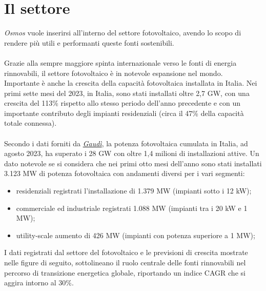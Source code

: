 \documentclass[a4paper, 12pt]{article}
\begin{document}
	\section{Il settore}
	\emph{Osmos} vuole inserirsi all'interno del settore fotovoltaico, avendo lo scopo di rendere più utili e performanti queste fonti sostenibili.\\\\
	Grazie alla sempre maggiore spinta internazionale verso le fonti di energia rinnovabili, il settore fotovoltaico è in notevole espansione nel mondo.\\
	Importante è anche la crescita della capacità fotovoltaica installata in Italia. Nei primi sette mesi del 2023, in Italia, sono stati installati oltre 2,7 GW, con una crescita del 113\% rispetto allo stesso periodo dell'anno precedente e con un importante contributo degli impianti residenziali (circa il 47\% della capacità totale connessa).\\\\
	Secondo i dati forniti da \href{https://www.terna.it/it/sistema-elettrico/dispacciamento/fonti-rinnovabili}{\emph{Gaudì}}, la potenza fotovoltaica cumulata in Italia, ad agosto 2023, ha superato i 28 GW con oltre 1,4 milioni di installazioni attive. Un dato notevole se si considera che nei primi otto mesi dell'anno sono stati installati 3.123 MW di potenza fotovoltaica con andamenti diversi per i vari segmenti:
	\begin{itemize}
		\item residenziali registrati l'installazione di 1.379 MW (impianti sotto i 12 kW);
		\item commerciale ed industriale  registrati 1.088 MW (impianti tra i 20 kW e 1 MW); 
		\item utility-scale aumento di 426 MW (impianti con potenza superiore a 1 MW);
	\end{itemize}
	I dati registrati dal settore del fotovoltaico e le previsioni di crescita mostrate nelle figure di seguito, sottolineano il ruolo centrale delle fonti rinnovabili nel percorso di transizione energetica globale, riportando un indice CAGR che si aggira intorno al 30\%.
\end{document}
